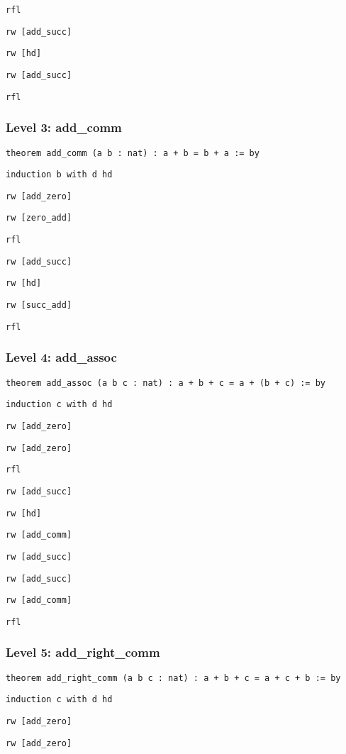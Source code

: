 \documentclass{article}
\begin{document}
\texttt{rfl}

\texttt{rw [add\_succ]}

\texttt{rw [hd]}

\texttt{rw [add\_succ]}

\texttt{rfl}

\subsubsection*{Level 3: add\_comm}
\texttt{theorem add\_comm (a b : nat) : a + b = b + a := by}

\texttt{induction b with d hd}

\texttt{rw [add\_zero]}

\texttt{rw [zero\_add]}

\texttt{rfl}

\texttt{rw [add\_succ]}

\texttt{rw [hd]}

\texttt{rw [succ\_add]}

\texttt{rfl}

\subsubsection*{Level 4: add\_assoc}
\texttt{theorem add\_assoc (a b c : nat) : a + b + c = a + (b + c) := by}

\texttt{induction c with d hd}

\texttt{rw [add\_zero]}

\texttt{rw [add\_zero]}

\texttt{rfl}

\texttt{rw [add\_succ]}

\texttt{rw [hd]}

\texttt{rw [add\_comm]}

\texttt{rw [add\_succ]}

\texttt{rw [add\_succ]}

\texttt{rw [add\_comm]}

\texttt{rfl}

\subsubsection*{Level 5: add\_right\_comm}

\texttt{theorem add\_right\_comm (a b c : nat) : a + b + c = a + c + b := by}

\texttt{induction c with d hd}

\texttt{rw [add\_zero]}

\texttt{rw [add\_zero]}
\end{document}
